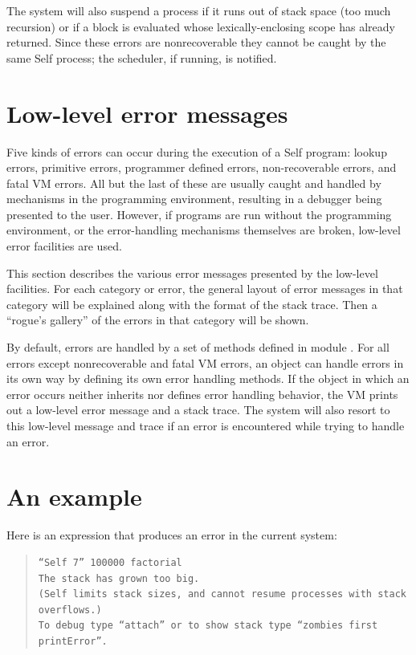 \documentclass[letterpaper,10pt,english]{sphinxmanual}
\begin{document}
The system will also suspend a process if it runs out of stack space (too much recursion) or if a
block is evaluated whose lexically-enclosing scope has already returned. Since these errors are
nonrecoverable they cannot be caught by the same Self process; the scheduler, if running, is notified.


\section{Low-level error messages}
\label{vmref:low-level-error-messages}
Five kinds of errors can occur during the execution of a Self program: lookup errors, primitive errors,
programmer defined errors, non-recoverable errors, and fatal VM errors. All but the last of
these are usually caught and handled by mechanisms in the programming environment, resulting
in a debugger being presented to the user. However, if programs are run without the programming
environment, or the error-handling mechanisms themselves are broken, low-level error facilities
are used.

This section describes the various error messages presented by the low-level facilities. For each
category or error, the general layout of error messages in that category will be explained along with
the format of the stack trace. Then a “rogue’s gallery” of the errors in that category will be shown.

By default, errors are handled by a set of methods defined in module . For all errors
except nonrecoverable and fatal VM errors, an object can handle errors in its own way by defining
its own error handling methods. If the object in which an error occurs neither inherits nor
defines error handling behavior, the VM prints out a low-level error message and a stack trace. The
system will also resort to this low-level message and trace if an error is encountered while trying
to handle an error.


\section{An example}
\label{vmref:an-example}
Here is an expression that produces an error in the current system:
\begin{quote}

\begin{Verbatim}[commandchars=\\\{\}]
“Self 7” 100000 factorial
The stack has grown too big.
(Self limits stack sizes, and cannot resume processes with stack overflows.)
To debug type “attach” or to show stack type “zombies first printError”.
\end{Verbatim}
\end{quote}
\end{document}
